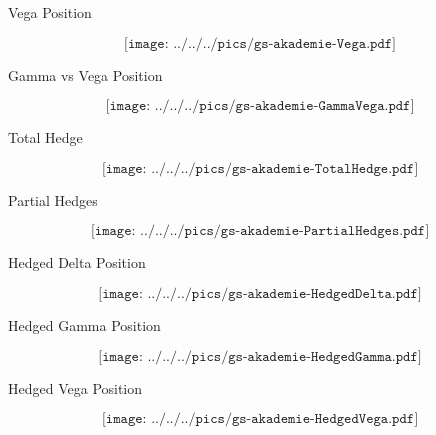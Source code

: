 {Vega Position}

$$\texttt{[image: ../../../pics/gs-akademie-Vega.pdf]}$$



{Gamma vs Vega Position}

$$\texttt{[image: ../../../pics/gs-akademie-GammaVega.pdf]}$$



{Total Hedge}

$$\texttt{[image: ../../../pics/gs-akademie-TotalHedge.pdf]}$$



{Partial Hedges}

$$\texttt{[image: ../../../pics/gs-akademie-PartialHedges.pdf]}$$




{Hedged Delta Position}

$$\texttt{[image: ../../../pics/gs-akademie-HedgedDelta.pdf]}$$


{Hedged Gamma Position}

$$\texttt{[image: ../../../pics/gs-akademie-HedgedGamma.pdf]}$$


{Hedged Vega Position}

$$\texttt{[image: ../../../pics/gs-akademie-HedgedVega.pdf]}$$



